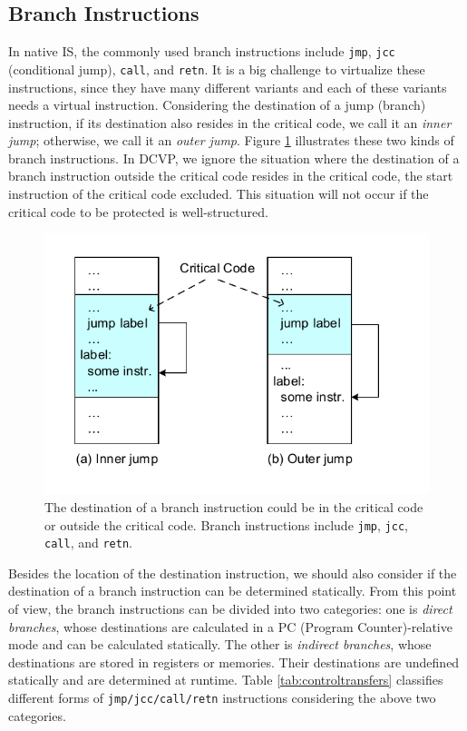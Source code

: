 \subsection{Branch Instructions}
In native IS, the commonly used branch instructions include \texttt{jmp}, \texttt{jcc} (conditional jump), \texttt{call}, and \texttt{retn}. It is a big challenge to virtualize these instructions, since they have many different variants and each of these variants needs a virtual instruction. Considering the destination of a jump (branch) instruction, if its destination also resides in the critical code, we call it an \emph{inner jump}; otherwise, we call it an \emph{outer jump}. Figure \ref{fig:jump} illustrates these two kinds of branch instructions. In DCVP, we ignore the situation where the destination of a branch instruction outside the critical code resides in the critical code, the start instruction of the critical code excluded. This situation will not occur if the critical code to be protected is well-structured.

\begin{figure}[!ht]
\centering
\includegraphics[width=0.45\columnwidth]{fig/jump.pdf}
\caption{The destination of a branch instruction could be in the critical code or outside the critical code. Branch instructions include \texttt{jmp}, \texttt{jcc}, \texttt{call}, and \texttt{retn}.}
\label{fig:jump}
\end{figure}

Besides the location of the destination instruction, we should also consider if the destination of a branch instruction can be determined statically. From this point of view, the branch instructions can be divided into two categories: one is \emph{direct branches}, whose destinations are calculated in a PC (Program Counter)-relative mode and can be calculated statically. The other is \emph{indirect branches}, whose destinations are stored in registers or memories. Their destinations are undefined statically and are determined at runtime. Table \ref{tab:controltransfers} classifies different forms of \texttt{jmp/jcc/call/retn} instructions considering the above two categories.

